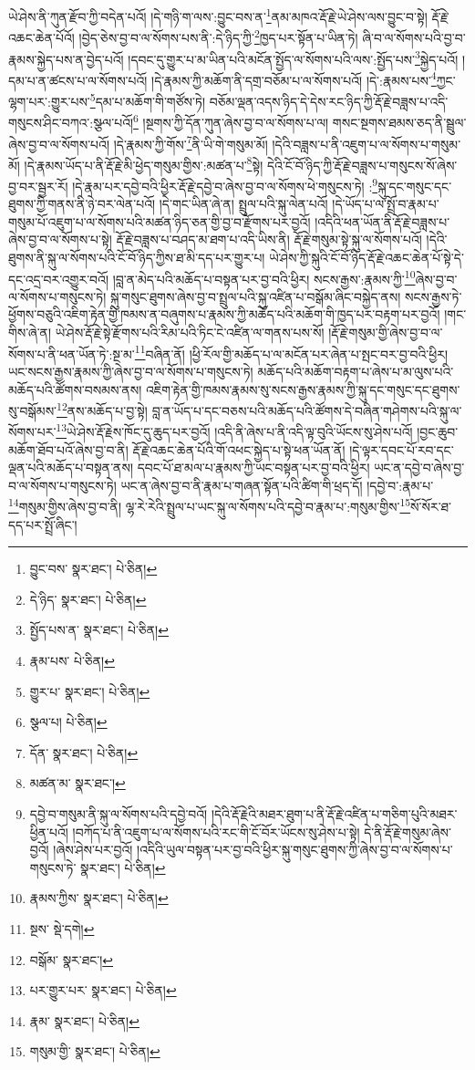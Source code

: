 ཡེ་ཤེས་ནི་ཀུན་རྫོབ་ཀྱི་བདེན་པའོ། །དེ་གཉི་ག་ལས་:བྱུང་བས་ན་\footnote{བྱུང་བས་  སྣར་ཐང་།  པེ་ཅིན། }ནམ་མཁའ་རྡོ་རྗེ་ཡེ་ཤེས་ལས་བྱུང་བ་སྟེ། རྡོ་རྗེ་འཆང་ཆེན་པོའོ། །བྱེད་ཅེས་བྱ་བ་ལ་སོགས་པས་ནི་:དེ་ཉིད་ཀྱི་\footnote{དེ་ཉིད་  སྣར་ཐང་།  པེ་ཅིན། }ཁྱད་པར་སྟོན་པ་ཡིན་ཏེ། ཞི་བ་ལ་སོགས་པའི་བྱ་བ་རྣམས་སྐྱེད་པས་ན་བྱེད་པའོ། །དབང་དུ་གྱུར་པ་མ་ཡིན་པའི་མངོན་སྤྱོད་ལ་སོགས་པའི་ལས་:སྤྱོད་པས་\footnote{སྤྱོད་པས་ན་  སྣར་ཐང་།  པེ་ཅིན། }སྐྱེད་པའོ། །དམ་པ་ན་ཚངས་པ་ལ་སོགས་པའོ། །དེ་རྣམས་ཀྱི་མཆོག་ནི་དགྲ་བཅོམ་པ་ལ་སོགས་པའོ། །དེ་:རྣམས་པས་\footnote{རྣམ་པས་  པེ་ཅིན། }ཀྱང་ལྷག་པར་:གྱུར་པས་\footnote{གྱུར་པ་  སྣར་ཐང་།  པེ་ཅིན། }དམ་པ་མཆོག་གི་གཙོས་ཏེ། བཅོམ་ལྡན་འདས་ཉིད་དེ་དེས་རང་ཉིད་ཀྱི་རྡོ་རྗེ་བཟླས་པ་འདི་གསུངས་ཤིང་བཀའ་:སྩལ་པའོ།\footnote{སྩལ་པ།  པེ་ཅིན། } །སྔགས་ཀྱི་དོན་ཀུན་ཞེས་བྱ་བ་ལ་སོགས་པ་ལ། གསང་སྔགས་ཐམས་ཅད་ནི་སྦྲུལ་ཞེས་བྱ་བ་ལ་སོགས་པའོ། །དེ་རྣམས་ཀྱི་གོས་\footnote{དོན་  སྣར་ཐང་།  པེ་ཅིན། }ནི་ཡི་གེ་གསུམ་མོ། །དེའི་བཟླས་པ་ནི་འཇུག་པ་ལ་སོགས་པ་གསུམ་མོ། །དེ་རྣམས་ཡོད་པ་ནི་རྡོ་རྗེ་མི་ཕྱེད་གསུམ་གྱིས་:མཚན་པ་\footnote{མཚན་མ་  སྣར་ཐང་། }སྟེ། དེའི་ངོ་བོ་ཉིད་ཀྱི་རྡོ་རྗེ་བཟླས་པ་གསུངས་སོ་ཞེས་བྱ་བར་སྦྱར་རོ། །དེ་རྣམ་པར་དབྱེ་བའི་ཕྱིར་རྡོ་རྗེ་དབྱེ་བ་ཞེས་བྱ་བ་ལ་སོགས་ཕེ་གསུངས་ཏེ། :\footnote{དབྱེ་བ་གསུམ་ནི་སྐུ་ལ་སོགས་པའི་དབྱེ་བའོ། །དེའི་རྡོ་རྗེའི་མཐར་ཐུག་པ་ནི་རྡོ་རྗེ་འཛིན་པ་གཅིག་པུའི་མཐར་ཕྱིན་པའོ། །བཀོད་པ་ནི་འཇུག་པ་ལ་སོགས་པའི་རང་གི་ངོ་བོར་ཡོངས་སུ་ཤེས་པ་སྟེ། དེ་ནི་རྡོ་རྗེ་གསུམ་ཞེས་བྱའོ། །ཞེས་ཤེས་པར་བྱའོ། །འདིའི་ཡུལ་བསྟན་པར་བྱ་བའི་ཕྱིར་སྐུ་གསུང་ཐུགས་ཀྱི་ཞེས་བྱ་བ་ལ་སོགས་པ་གསུངས་ཏེ་  སྣར་ཐང་།  པེ་ཅིན། }སྐུ་དང་གསུང་དང་ཐུགས་ཀྱི་གནས་ནི་ཉེ་བར་ལེན་པའོ། །དེ་གང་ཡིན་ཞེ་ན། སྤྲུལ་པའི་སྐུ་ལེན་པའོ། །དེ་ཡོད་པ་ལ་སྤྲོ་བ་རྣམ་པ་གསུམ་པོ་འཇུག་པ་ལ་སོགས་པའི་མཚན་ཉིད་ཅན་གྱི་བྱ་བ་རྫོགས་པར་བྱའོ། །འདིའི་ཕན་ཡོན་ནི་རྡོ་རྗེ་བཟླས་པ་ཞེས་བྱ་བ་ལ་སོགས་པ་སྟེ། རྡོ་རྗེ་བཟླས་པ་བཤད་མ་ཐག་པ་འདི་ཡིས་ནི། རྡོ་རྗེ་གསུམ་སྟེ་སྐུ་ལ་སོགས་པའོ། །དེའི་ཐུགས་ནི་སྐུ་ལ་སོགས་པའི་ངོ་བོ་ཉིད་ཀྱིས་ཐ་མི་དད་པར་གྱུར་པ། ཡེ་ཤེས་ཀྱི་སྐུའི་ངོ་བོ་ཉིད་རྡོ་རྗེ་འཆང་ཆེན་པོ་སྟེ་དེ་དང་འདྲ་བར་འགྱུར་བའོ། །བླ་ན་མེད་པའི་མཆོད་པ་བསྟན་པར་བྱ་བའི་ཕྱིར། སངས་རྒྱས་:རྣམས་ཀྱི་\footnote{རྣམས་ཀྱིས་  སྣར་ཐང་།  པེ་ཅིན། }ཞེས་བྱ་བ་ལ་སོགས་པ་གསུངས་ཏེ། སྐུ་གསུང་ཐུགས་ཞེས་བྱ་བ་སྤྲུལ་པའི་སྐུ་འཛིན་པ་བསྒོམ་ཞིང་བསྐྱེད་ནས། སངས་རྒྱས་ཏེ་ཕྱོགས་བཅུའི་འཇིག་རྟེན་གྱི་ཁམས་ན་བཞུགས་པ་རྣམས་ཀྱི་མཆོད་པའི་མཆོག་གི་ཁྱད་པར་བརྟག་པར་བྱའོ། །གང་གིས་ཞེ་ན། ཡེ་ཤེས་རྡོ་རྗེ་སྟེ་རྫོགས་པའི་རིམ་པའི་ཏིང་ངེ་འཛིན་ལ་གནས་པས་སོ། །རྡོ་རྗེ་གསུམ་གྱི་ཞེས་བྱ་བ་ལ་སོགས་པ་ནི་ཕན་ཡོན་ཏེ་:སྔ་མ་\footnote{སྔས་  སྡེ་དགེ། }བཞིན་ནོ། །ཕྱི་རོལ་གྱི་མཆོད་པ་ལ་མངོན་པར་ཞེན་པ་སྤང་བར་བྱ་བའི་ཕྱིར། ཡང་སངས་རྒྱས་རྣམས་ཀྱི་ཞེས་བྱ་བ་ལ་སོགས་པ་གསུངས་ཏེ། མཆོད་པའི་མཆོག་བརྟག་པ་ཞེས་པ་མ་ལུས་པའི་མཆོད་པའི་ཚོགས་བསམས་ནས། འཇིག་རྟེན་གྱི་ཁམས་རྣམས་སུ་སངས་རྒྱས་རྣམས་ཀྱི་སྐུ་དང་གསུང་དང་ཐུགས་སུ་བསྒོམས་\footnote{བསྒོམ་  སྣར་ཐང་། }ནས་མཆོད་པ་བྱ་སྟེ། བླ་ན་ཡོད་པ་དང་བཅས་པའི་མཆོད་པའི་ཚོགས་དེ་བཞིན་གཤེགས་པའི་སྐུ་ལ་སོགས་པར་\footnote{པར་གྱུར་པར་  སྣར་ཐང་།  པེ་ཅིན། }ཡེ་ཤེས་རྡོ་རྗེས་ཁོང་དུ་ཆུད་པར་བྱའོ། །འདི་ནི་ཞེས་པ་ནི་འདི་ལྟ་བུའི་ཡོངས་སུ་ཤེས་པའོ། །བྱང་ཆུབ་མཆོག་ཐོབ་པའོ་ཞེས་བྱ་བ་ནི། རྡོ་རྗེ་འཆང་ཆེན་པོའི་གོ་འཕང་སྐྱེད་པ་སྟེ་ཕན་ཡོན་ནོ། །དེ་ལྟར་དབང་པོ་རབ་དང་ལྡན་པའི་མཆོད་པ་བསྟན་ནས། དབང་པོ་ཐ་མལ་པ་རྣམས་ཀྱི་ཡང་བསྟན་པར་བྱ་བའི་ཕྱིར། ཡང་ན་དབྱེ་བ་ཞེས་བྱ་བ་ལ་སོགས་པ་གསུངས་ཏེ། ཡང་ན་ཞེས་བྱ་བ་ནི་རྣམ་པ་གཞན་སྟོན་པའི་ཚིག་གི་ཕྲད་དོ། །དབྱེ་བ་:རྣམ་པ་\footnote{རྣམ་  སྣར་ཐང་།  པེ་ཅིན། }གསུམ་གྱིས་ཞེས་བྱ་བ་ནི། ལྷ་རེ་རེའི་སྤྲུལ་པ་ཡང་སྐུ་ལ་སོགས་པའི་དབྱེ་བ་རྣམ་པ་:གསུམ་གྱིས་\footnote{གསུམ་གྱི་  སྣར་ཐང་།  པེ་ཅིན། }སོ་སོར་ཐ་དད་པར་སྤྲོ་ཞིང་། 